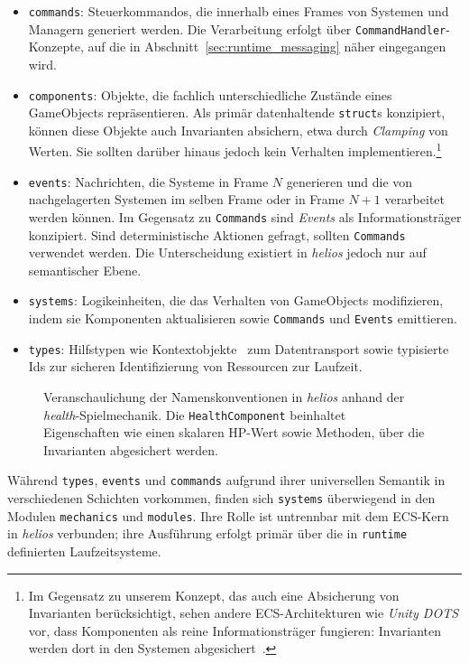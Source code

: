 \begin{itemize}
    \itemsep0.5em
    \item \texttt{commands}: Steuerkommandos, die innerhalb eines Frames von Systemen und Managern generiert werden.
    Die Verarbeitung erfolgt über \texttt{CommandHandler}-Konzepte, auf die in Abschnitt~\ref{sec:runtime_messaging} näher eingegangen wird.
    \item \texttt{components}: Objekte, die fachlich unterschiedliche Zustände eines GameObjects repräsentieren.
    Als primär datenhaltende \texttt{struct}s konzipiert, können diese Objekte auch Invarianten absichern, etwa durch \textit{Clamping} von Werten.
    Sie sollten darüber hinaus jedoch kein Verhalten implementieren.\footnote{
        Im Gegensatz zu unserem Konzept, das auch eine Absicherung von Invarianten berücksichtigt, sehen andere ECS-Architekturen wie \textit{Unity DOTS} vor, dass Komponenten als reine Informationsträger fungieren: Invarianten werden dort in den Systemen abgesichert~\cite{UnityComponentConcepts}.
    }
    \item \texttt{events}: Nachrichten, die Systeme in Frame $N$ generieren und die von nachgelagerten Systemen im selben Frame oder in Frame $N+1$ verarbeitet werden können.
    Im Gegensatz zu \texttt{Commands} sind \textit{Events} als Informationsträger konzipiert.
    Sind deterministische Aktionen gefragt, sollten \texttt{Commands} verwendet werden.
    Die Unterscheidung existiert in \textit{helios} jedoch nur auf semantischer Ebene.
    \item \texttt{systems}: Logikeinheiten, die das Verhalten von GameObjects modifizieren, indem sie Komponenten aktualisieren sowie \texttt{Commands} und \texttt{Events} emittieren.
    \item \texttt{types}: Hilfstypen wie Kontextobjekte~\cite[182-204]{ACM03} zum Datentransport sowie typisierte Ids zur sicheren Identifizierung von Ressourcen zur Laufzeit.
\end{itemize}

\begin{figure}[!htbp]
    \setlength{\DTbaselineskip}{18pt}
    \caption{Veranschaulichung der Namenskonventionen in \textit{helios} anhand der \textit{health}-Spielmechanik.
    Die \texttt{HealthComponent} beinhaltet Eigenschaften wie einen skalaren HP-Wert sowie Methoden, über die Invarianten abgesichert werden.}
    \label{fig:health_struktur}
\end{figure}

Während \texttt{types}, \texttt{events} und \texttt{commands} aufgrund ihrer universellen Semantik in verschiedenen Schichten vorkommen, finden sich \texttt{systems} überwiegend in den Modulen \texttt{mechanics} und \texttt{modules}.
Ihre Rolle ist untrennbar mit dem ECS-Kern in \textit{helios} verbunden; ihre Ausführung erfolgt primär über die in \texttt{runtime} definierten Laufzeitsysteme.